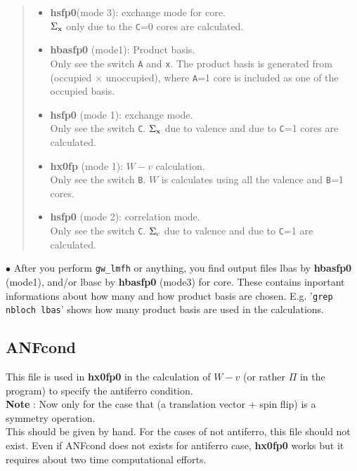 \documentclass[a4paper,10pt,epsf,fleqn]{article}
\newcommand{\fx}[1]{\subsection{\sf #1\index{\sf #1}}}
\newcommand{\exe}[1]{{\bf #1}}
\newcommand{\io}[1]{{\sf  #1}}
\newcommand{\raw}[1]{{\tt #1}}
\begin{document}
{\begin{quote}
\begin{itemize}
\item 
\exe{hsfp0}(mode 3): exchange mode for core.\\
$\Sigma_{\rm x}$ only due to the \raw{C}=0 cores are calculated.

\item 
\exe{hbasfp0} (mode1): Product basis.\\
Only see the switch \raw{A} and \raw{x}.
The product basis is generated from (occupied $\times$ unoccupied), 
where \raw{A}=1 core is included as one of the occupied basis.

\item 
\exe{hsfp0} (mode 1): exchange mode.\\
Only see the switch \raw{C}.
$\Sigma_{\rm x}$ due to valence and due to \raw{C}=1 cores
are calculated.

\item 
\exe{hx0fp} (mode 1): $W-v$ calculation.\\
Only see the switch \raw{B}.
$W$ is calculates using all the valence and \raw{B}=1 cores.

\item 
\exe{hsfp0} (mode 2): correlation mode.\\
Only see the switch \raw{C}.
$\Sigma_{\rm c}$ due to valence and due to \raw{C}=1 are calculated.

\end{itemize}

\end{quote}

\noindent $\bullet$ After you perform \verb#gw_lmfh# or anything,
you find output files \io{lbas} by \exe{hbasfp0} (mode1), and/or \io{lbasc}
by \exe{hbasfp0} (mode3) for core. These contains inportant informations
about how many and how product basis are chosen. 
E.g. '\verb#grep nbloch lbas#' shows how many product basis are used in the calculations.



\fx{ANFcond} 
This file is used in {\bf hx0fp0} in the calculation of $W-v$ 
(or rather $\Pi$ in the program) to specify the antiferro condition.\\

{\bf Note} : Now only for the case that 
(a translation vector + spin flip) is a symmetry operation.\\

This should be given by hand. For the cases of not antiferro,
this file should not exist. Even if {\sf ANFcond } 
does not exists for antiferro case, {\bf hx0fp0} works but it 
requires about two time computational efforts.


}
\end{document}
